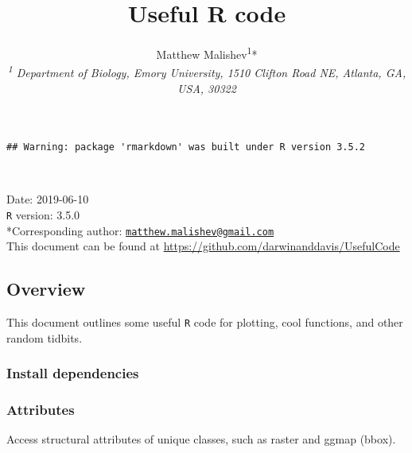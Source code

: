 \documentclass[10,portrait]{article}
\title{Useful R code}
\author{Matthew
Malishev\textsuperscript{1}*\\[2\baselineskip]\emph{\textsuperscript{1}
Department of Biology, Emory University, 1510 Clifton Road NE, Atlanta,
GA, USA, 30322}}
\date{}
\newenvironment{Shaded}{\begin{snugshade}}{\end{snugshade}}
\newcommand{\KeywordTok}[1]{\textcolor[rgb]{0.13,0.29,0.53}{\textbf{#1}}}
\newcommand{\DataTypeTok}[1]{\textcolor[rgb]{0.13,0.29,0.53}{#1}}
\newcommand{\DecValTok}[1]{\textcolor[rgb]{0.00,0.00,0.81}{#1}}
\newcommand{\StringTok}[1]{\textcolor[rgb]{0.31,0.60,0.02}{#1}}
\newcommand{\CommentTok}[1]{\textcolor[rgb]{0.56,0.35,0.01}{\textit{#1}}}
\newcommand{\OperatorTok}[1]{\textcolor[rgb]{0.81,0.36,0.00}{\textbf{#1}}}
\newcommand{\NormalTok}[1]{#1}
\begin{document}
\maketitle

{
\hypersetup{linkcolor=black}
\setcounter{tocdepth}{4}
\tableofcontents
}
\begin{verbatim}
## Warning: package 'rmarkdown' was built under R version 3.5.2
\end{verbatim}

~

Date: 2019-06-10\\
\texttt{R} version: 3.5.0\\
*Corresponding author:
\href{mailto:matthew.malishev@gmail.com}{\nolinkurl{matthew.malishev@gmail.com}}\\
This document can be found at
\url{https://github.com/darwinanddavis/UsefulCode}

\newpage  

\subsection{Overview}\label{overview}

This document outlines some useful \texttt{R} code for plotting, cool
functions, and other random tidbits.

\subsubsection{Install dependencies}\label{install-dependencies}

\subsubsection{Attributes}\label{attributes}

Access structural attributes of unique classes, such as raster and ggmap
(bbox).

\begin{Shaded}
\end{Shaded}
\end{document}
